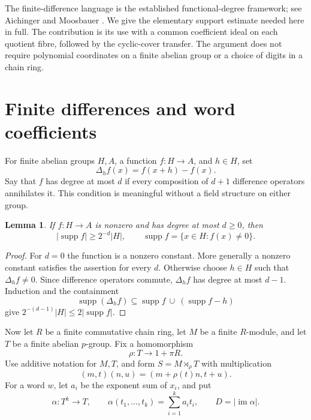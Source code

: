 \documentclass[11pt]{article}
\newtheorem{lemma}[theorem]{Lemma}
\theoremstyle{remark}\newtheorem{remark}[theorem]{Remark}
\newcommand{\im}{\operatorname{im}}
\newcommand{\supp}{\operatorname{supp}}
\begin{document}
The finite-difference language is the established functional-degree framework; see Aichinger and Moosbauer \cite{AM}. We give the elementary support estimate needed here in full. The contribution is its use with a common coefficient ideal on each quotient fibre, followed by the cyclic-cover transfer. The argument does not require polynomial coordinates on a finite abelian group or a choice of digits in a chain ring.

\section{Finite differences and word coefficients}
For finite abelian groups $H,A$, a function $f:H\to A$, and $h\in H$, set
\[
 \Delta_h f(x)=f(x+h)-f(x).
\]
Say that $f$ has degree at most $d$ if every composition of $d+1$ difference operators annihilates it. This condition is meaningful without a field structure on either group.

\begin{lemma}\label{lem:support}
If $f:H\to A$ is nonzero and has degree at most $d\ge0$, then
\[
 |\supp f|\ge 2^{-d}|H|,
 \qquad \supp f=\{x\in H:f(x)\ne0\}.
\]
\end{lemma}
\begin{proof}
For $d=0$ the function is a nonzero constant. More generally a nonzero constant satisfies the assertion for every $d$. Otherwise choose $h\in H$ such that $\Delta_h f\ne0$. Since difference operators commute, $\Delta_h f$ has degree at most $d-1$. Induction and the containment
\[
 \supp(\Delta_h f)\subseteq\supp f\ \cup\ (\supp f-h)
\]
give $2^{-(d-1)}|H|\le2|\supp f|$.
\end{proof}

Now let $R$ be a finite commutative chain ring, let $M$ be a finite $R$-module, and let $T$ be a finite abelian $p$-group. Fix a homomorphism
\[
 \rho:T\longrightarrow 1+\pi R.
\]
Use additive notation for $M,T$, and form $S=M\rtimes_\rho T$ with multiplication
\begin{equation}\label{eq:product}
 (m,t)(n,u)=(m+\rho(t)n,t+u).
\end{equation}
For a word $w$, let $a_i$ be the exponent sum of $x_i$, and put
\begin{equation}\label{eq:alpha}
 \alpha:T^k\to T,\qquad
 \alpha(t_1,\ldots,t_k)=\sum_{i=1}^k a_i t_i,
 \qquad D=|\im\alpha|.
\end{equation}
\end{document}
